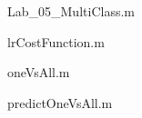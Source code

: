 \documentclass[10pt, a4paper]{article}
\begin{document}
Lab\_05\_MultiClass.m


lrCostFunction.m


oneVsAll.m


predictOneVsAll.m

\end{document}
